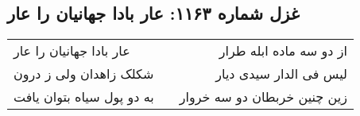 \begin{center}
\section*{غزل شماره ۱۱۶۳: عار بادا جهانیان را عار}
\label{sec:1163}
\begin{longtable}{l p{0.5cm} r}
عار بادا جهانیان را عار
&&
از دو سه ماده ابله طرار
\\
شکلک زاهدان ولی ز درون
&&
لیس فی الدار سیدی دیار
\\
به دو پول سیاه بتوان یافت
&&
زین چنین خربطان دو سه خروار
\\
\end{longtable}
\end{center}
